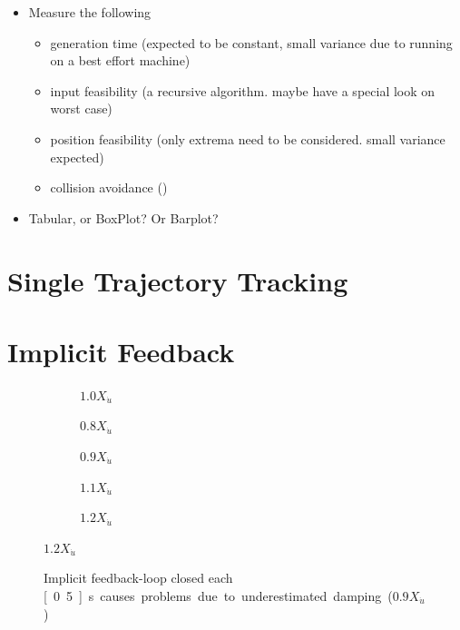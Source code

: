\begin{itemize}
	\color{red}
	\item Measure the following
	\begin{itemize}
		\item generation time (expected to be constant, small variance due to running on a best effort machine)
		\item input feasibility (a recursive algorithm. maybe have a special look on worst case)
		\item position feasibility (only extrema need to be considered. small variance expected)
		\item collision avoidance ()
	\end{itemize}
	\item Tabular, or BoxPlot? Or Barplot? 
\end{itemize}

\section{Single Trajectory Tracking}


\section{Implicit Feedback}

\begin{figure}
	\centering
	\begin{subfigure}[t]{0.49\textwidth}
		\centering
		
		\caption{$1.0 X_{\dot{u}}$}
	\end{subfigure}

	\begin{subfigure}[t]{0.49\textwidth}
		\centering
		
		\caption{$0.8 X_{\dot{u}}$}
	\end{subfigure}
	\begin{subfigure}[t]{0.49\textwidth}
		\centering
		
		\caption{$0.9 X_{\dot{u}}$}
	\end{subfigure}

	\begin{subfigure}[t]{0.49\textwidth}
		\centering
		
		\caption{$1.1 X_{\dot{u}}$}
	\end{subfigure}
	\begin{subfigure}[t]{0.49\textwidth}
		\centering
		
		\caption{$1.2 X_{\dot{u}}$}
	\end{subfigure}
\end{figure}
\begin{figure}
	
	\caption{Implicit feedback-loop closed each \unit[0.5]{s} causes problems due to underestimated damping ($0.9 X_{\dot{u}}$)}
	\label{fig:implicit_problem_velocity}
\end{figure}

